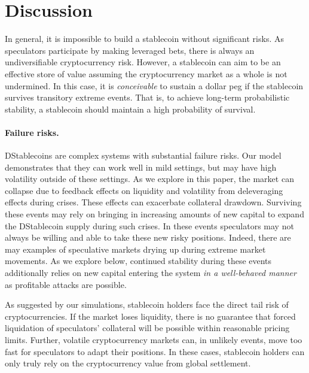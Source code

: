 \section{Discussion}\label{sec:discussion}

In general, it is impossible to build a stablecoin without significant risks. As speculators participate by making leveraged bets, there is always an undiversifiable cryptocurrency risk. However, a stablecoin can aim to be an effective store of value assuming the cryptocurrency market as a whole is not undermined. In this case, it is \emph{conceivable} to sustain a dollar peg if the stablecoin survives transitory extreme events. That is, to achieve long-term probabilistic stability, a stablecoin should maintain a high probability of survival.



\paragraph{Failure risks.} DStablecoins are complex systems with substantial failure risks. Our model demonstrates that they can work well in mild settings, but may have high volatility outside of these settings. As we explore in this paper, the market can collapse due to feedback effects on liquidity and volatility from deleveraging effects during crises. These effects can exacerbate collateral drawdown. Surviving these events may rely on bringing in increasing amounts of new capital to expand the DStablecoin supply during such crises. In these events speculators may not always be willing and able to take these new risky positions. Indeed, there are may examples of speculative markets drying up during extreme market movements. As we explore below, continued stability during these events additionally relies on new capital entering the system \emph{in a well-behaved manner} as profitable attacks are possible.

As suggested by our simulations, stablecoin holders face the direct tail risk of cryptocurrencies. If the market loses liquidity, there is no guarantee that forced liquidation of speculators' collateral will be possible within reasonable pricing limits. Further, volatile cryptocurrency markets can, in unlikely events, move too fast for speculators to adapt their positions. In these cases, stablecoin holders can only truly rely on the cryptocurrency value from global settlement.





